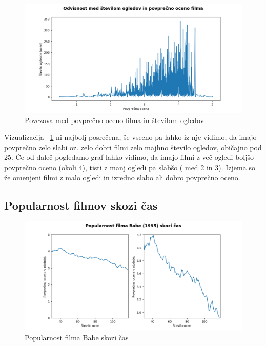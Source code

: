 \documentclass[a4paper,11pt]{article}
\begin{document}
\begin{figure}[htbp]
\begin{center}
\includegraphics[scale=0.5]{viewsVsMeanRate.png}
\caption{Povezava med povprečno oceno filma in številom ogledov} \label{fig:img2}
\end{center}
\end{figure}
Vizualizacija ~\ref{fig:img2} ni najbolj posrečena, še vseeno pa lahko iz nje
vidimo, da imajo povprečno zelo slabi oz. zelo dobri filmi zelo majhno število
ogledov, običajno pod 25. Če od daleč pogledamo graf lahko vidimo, da imajo filmi
z več ogledi boljšo povprečno oceno (okoli 4), tisti z manj ogledi pa slabšo (
med 2 in 3). Izjema so že omenjeni filmi z malo ogledi in izredno slabo ali dobro
povprečno oceno.

\subsection{Popularnost filmov skozi čas}


\begin{figure}[htbp]
\begin{center}
\includegraphics[scale=0.6]{34-babe.png}
\caption{Popularnost filma Babe skozi čas} \label{fig:img4}
\end{center}
\end{figure}
\end{document}
